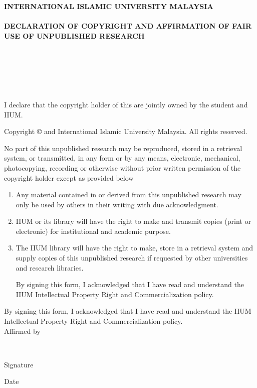 \documentclass[12pt, a4paper, oneside, showtrims]{memoir}
\begin{document}
\thispagestyle{empty}

\begin{center}
{\fontsize{14bp}{16bp}\selectfont
\textbf{\MakeUppercase{International Islamic University Malaysia}}\\~\\
\textbf{\MakeUppercase{Declaration of Copyright and Affirmation of Fair Use of 
Unpublished Research}}\\~\\
\textbf{\MakeUppercase{\myTitle}}\\
\ifdefined\mySubtitle
\textbf{\MakeUppercase{\mySubtitle}}\\~\\
\else
\\~\\
\fi
}
\noindent I declare that the copyright holder of this 
\myDocument are jointly owned by the student and IIUM.\\
\end{center}

\begin{center}
{\fontsize{10bp}{12bp}\selectfont
\noindent Copyright \copyright{} \myYear \myName and International Islamic 
University 
Malaysia. All rights reserved.}\\
\end{center}

\noindent No part of this unpublished research may be reproduced, stored in a 
retrieval
system, or transmitted, in any form or by any means, electronic, mechanical,
photocopying, recording or otherwise without prior written permission of the
copyright holder except as provided below

\begin{enumerate}
\item Any material contained in or derived from this unpublished research
may only be used by others in their writing with due acknowledgment.

\item IIUM or its library will have the right to make and transmit copies
(print or electronic) for institutional and academic purpose.

\item The IIUM library will have the right to make, store in a retrieval system
and supply copies of this unpublished research if requested by other
universities and research libraries.

By signing this form, I acknowledged that I have read and understand the
IIUM Intellectual Property Right and Commercialization policy.
\end{enumerate}

\noindent By signing this form, I acknowledged that I have read and understand 
the
IIUM Intellectual Property Right and Commercialization policy.\\[48pt]

\noindent Affirmed by \myName\\

\vfill

\noindent \makebox[2in]{\dotfill} \hfill \makebox[2in]{\dotfill}\\
\parbox{2in}{\centering Signature} \hfill \parbox{2in}{\centering Date}
\end{document}
